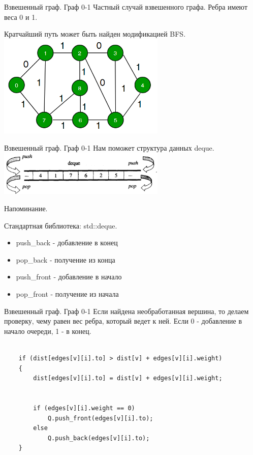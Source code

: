 \documentclass[10pt]{beamer}
\begin{document}
\begin{frame}[fragile]{Взвешенный граф. Граф 0-1}
Частный случай взвешенного графа. Ребра имеют веса 0 и 1.

Кратчайший путь может быть найден модификацией BFS.
    \includegraphics[width=8cm]{Term_2/Source/images/binary-graph.png}
    
\end{frame}

\begin{frame}[fragile]{Взвешенный граф. Граф 0-1}
Нам поможет структура данных deque.
    \includegraphics[width=8cm]{Term_2/Source/images/deque.png}
    
Напоминание.

Стандартная библиотека: std::deque.
    \begin{itemize}
        \item push\_back - добавление в конец
        \item pop\_back - получение из конца
        \item push\_front - добавление в начало
        \item pop\_front - получение из начала
    \end{itemize}

\end{frame}

\begin{frame}[fragile]{Взвешенный граф. Граф 0-1}
Если найдена необработанная вершина, то делаем проверку, чему равен вес ребра, который ведет к ней. Если 0 - добавление в начало очереди, 1 - в конец.

\begin{lstlisting}

    if (dist[edges[v][i].to] > dist[v] + edges[v][i].weight) 
    { 
        dist[edges[v][i].to] = dist[v] + edges[v][i].weight; 
    
        
        if (edges[v][i].weight == 0) 
            Q.push_front(edges[v][i].to); 
        else
            Q.push_back(edges[v][i].to); 
    }
\end{lstlisting}
\end{frame}
            
\end{document}
